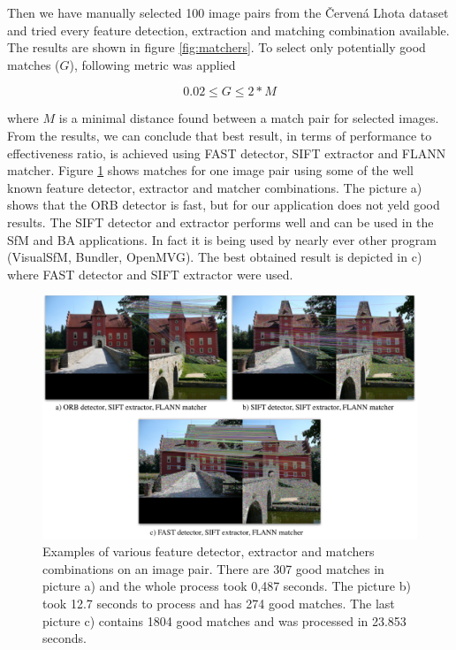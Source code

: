 Then we have manually selected 100 image pairs from the Červená Lhota dataset and tried every feature detection, extraction and matching combination available. The results are shown in figure \ref{fig:matchers}. To select only potentially good matches ($G$), following metric was applied

\begin{equation}
	0.02 \leq G \leq 2* M
\end{equation}

where $M$ is a minimal distance found between a match pair for selected images. From the results, we can conclude that best result, in terms of performance to effectiveness ratio, is achieved using FAST detector, SIFT extractor and FLANN matcher. Figure \ref{fig:matches} shows matches for one image pair using some of the well known feature detector, extractor and matcher combinations. The picture a) shows that the ORB detector is fast, but for our application does not yeld good results. The SIFT detector and extractor performs well and can be used in the SfM and BA applications. In fact it is being used by nearly ever other program (VisualSfM, Bundler, OpenMVG). The best obtained result is depicted in c) where FAST detector and SIFT extractor were used.

\begin{figure}[!htbp]
	\begin{center}
		\includegraphics[keepaspectratio,width=\textwidth]{fig/matches.pdf}
	\end{center}
	\caption{Examples of various feature detector, extractor and matchers combinations on an image pair. There are 307 good matches in picture a) and the whole process took 0,487 seconds. The picture b) took 12.7 seconds to process and has 274 good matches. The last picture c) contains 1804 good matches and was processed in 23.853 seconds.}
	\label{fig:matches}
\end{figure}


